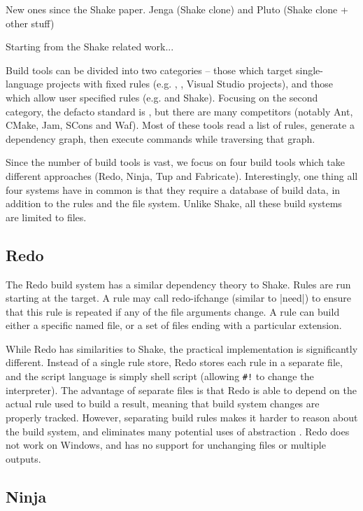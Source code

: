 New ones since the Shake paper. Jenga (Shake clone) and Pluto (Shake clone + other stuff)

Starting from the Shake related work...

Build tools can be divided into two categories -- those which target single-language projects with fixed rules (e.g. , , Visual Studio projects), and those which allow user specified rules (e.g. \make{} and Shake). Focusing on the second category, the defacto standard is \make{}, but there are many \make{} competitors (notably Ant, CMake, Jam, SCons and Waf). Most of these tools read a list of rules, generate a dependency graph, then execute commands while traversing that graph.

Since the number of build tools is vast, we focus on four build tools which take different approaches (Redo, Ninja, Tup and Fabricate). Interestingly, one thing all four systems have in common is that they require a database of build data, in addition to the rules and the file system. Unlike Shake, all these build systems are limited to files.

\subsection{Redo\label{sec:redo}}


The Redo build system \cite{redo} has a similar dependency theory to Shake. Rules are run starting at the target. A rule may call \textsf{redo-ifchange} (similar to |need|) to ensure that this rule is repeated if any of the file arguments change. A rule can build either a specific named file, or a set of files ending with a particular extension.

While Redo has similarities to Shake, the practical implementation is significantly different. Instead of a single rule store, Redo stores each rule in a separate file, and the script language is simply shell script (allowing \verb"#!" to change the interpreter). The advantage of separate files is that Redo is able to depend on the actual rule used to build a result, meaning that build system changes are properly tracked. However, separating build rules makes it harder to reason about the build system, and eliminates many potential uses of abstraction \cite{jonge:build_components}. Redo does not work on Windows, and has no support for unchanging files or multiple outputs.

\subsection{Ninja\label{sec:ninja}}

